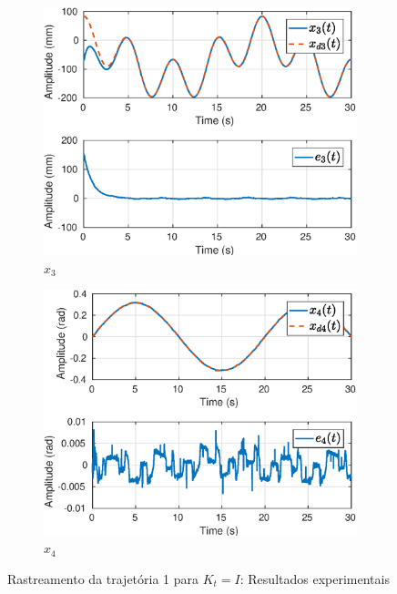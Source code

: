 \begin{figure}[H]
\begin{subfigure}{.5\textwidth}
  \includegraphics[width=\linewidth]{./img/traj_1_k1/x3.eps}
  \caption{$x_3$}
  \label{fig:sub1}
\end{subfigure}%
\begin{subfigure}{.5\textwidth}
  \centering
  \includegraphics[width=\linewidth]{./img/traj_1_k1/x4.eps}
  \caption{$x_4$}
  \label{fig:sub2}
\end{subfigure}
\caption{Rastreamento da trajetória 1 para ${K}_t = {I}$: Resultados experimentais}
\label{fig:test}
\end{figure}

